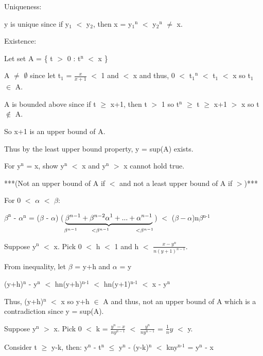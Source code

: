 	{ \color{lblue} Uniqueness: }

	y is unique since if y$_{1}$ $<$ y$_{2}$, then
	x = y$_{1}$$^\text{n}$ $<$ y$_{2}$$^\text{n}$ $\neq$ x.

	{ \color{lblue} Existence: }

	Let set A = \{ t $>$ 0 : t$^\text{n}$ $<$ x \}

	A $\not =$ $\emptyset$ since let t$_{1}$ = $\frac{x}{x+1}$ $<$ 1 and $<$ x
	and thus, 0 $<$ t$_{1}$$^\text{n}$ $<$ t$_{1}$ $<$ x so t$_{1}$ $\in$ A.

	A is bounded above since if t $ \geq $ x+1, then
	t $>$ 1 so t$^\text{n}$ $ \geq $ t $ \geq $ x+1 $>$ x so t $\not \in$ A.

	So x+1 is an upper bound of A.

	Thus by the least upper bound property, y = sup(A) exists.

	For y$^\text{n}$ = x, show y$^\text{n}$ $<$ x and y$^\text{n}$ $>$ x cannot hold true.

	***(Not an upper bound of A if $<$ and not a least upper bound of A if $>$)***

	For 0 $<$ $\alpha$ $<$ $\beta$:

	\qquad $\beta ^\text{n}$ - $\alpha^\text{n}$
	= ($\beta$ - $\alpha$) ($\underbrace{\beta^{n-1} + \beta^{n-2}\alpha^1 + ... + \alpha^{n-1}}
	_{\beta^{n-1} \hspace{0.7cm} <\beta^{n-1} \hspace{1.3cm} <\beta^{n-1}}$)
	$<$ ($\beta - \alpha$)n$\beta$$^\text{n-1}$ 

	Suppose y$^\text{n}$ $<$ x. Pick 0 $<$ h $<$ 1 and h $<$ $\frac{x-y^n}{n(y+1)^{n-1}}$.

	\qquad From inequality, let $\beta$ = y+h and $\alpha$ = y

	\qquad \qquad (y+h)$^\text{n}$ - y$^\text{n}$ $<$ hn(y+h)$^\text{n-1}$
	$<$ hn(y+1)$^\text{n-1}$ $<$ x - y$^\text{n}$

	\begin{adjustbox}{minipage=14.2cm, right}
		Thus, (y+h)$^\text{n}$ $<$ x so y+h $\in$ A and thus, not an upper bound of A
		which is a contradiction since y = sup(A).
	\end{adjustbox}

	Suppose y$^\text{n}$ $>$ x.
	Pick 0 $<$ k = $\frac{y^n - x}{ny^{n-1}}$ $<$ $\frac{y^n}{ny^{n-1}}$
	= $\frac{1}{n}y$ $<$ y.

	\qquad Consider t $ \geq $  y-k, then:
	y$^\text{n}$ - t$^\text{n}$ $ \leq $  y$^\text{n}$ - (y-k)$^\text{n}$ $<$
	kny$^\text{n-1}$ = y$^\text{n}$ - x

